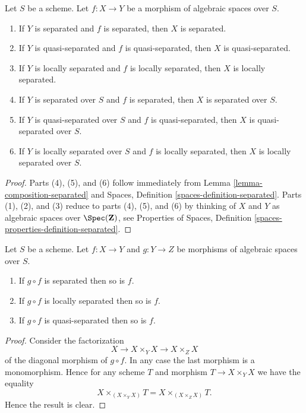 \begin{lemma}
\label{lemma-separated-over-separated}
Let $S$ be a scheme.
Let $f : X \to Y$ be a morphism of algebraic spaces over $S$.
\begin{enumerate}
\item If $Y$ is separated and $f$ is separated, then $X$ is separated.
\item If $Y$ is quasi-separated and $f$ is quasi-separated, then
$X$ is quasi-separated.
\item If $Y$ is locally separated and $f$ is locally separated, then
$X$ is locally separated.
\item If $Y$ is separated over $S$ and $f$ is separated, then
$X$ is separated over $S$.
\item If $Y$ is quasi-separated over $S$ and $f$ is quasi-separated, then
$X$ is quasi-separated over $S$.
\item If $Y$ is locally separated over $S$ and $f$ is locally separated, then
$X$ is locally separated over $S$.
\end{enumerate}
\end{lemma}

\begin{proof}
Parts (4), (5), and (6) follow immediately from
Lemma \ref{lemma-composition-separated}
and
Spaces, Definition \ref{spaces-definition-separated}.
Parts (1), (2), and (3) reduce to parts (4), (5), and (6) by thinking
of $X$ and $Y$ as algebraic spaces over $\Spec(\mathbf{Z})$, see
Properties of Spaces, Definition \ref{spaces-properties-definition-separated}.
\end{proof}

\begin{lemma}
\label{lemma-compose-after-separated}
Let $S$ be a scheme.
Let $f : X \to Y$ and $g : Y \to Z$ be morphisms of algebraic spaces over $S$.
\begin{enumerate}
\item If $g \circ f$ is separated then so is $f$.
\item If $g \circ f$ is locally separated then so is $f$.
\item If $g \circ f$ is quasi-separated then so is $f$.
\end{enumerate}
\end{lemma}

\begin{proof}
Consider the factorization
$$
X \to X \times_Y X \to X \times_Z X
$$
of the diagonal morphism of $g \circ f$. In any case the last morphism
is a monomorphism. Hence for any scheme $T$ and morphism
$T \to X \times_Y X$ we have the equality
$$
X \times_{(X \times_Y X)} T = X \times_{(X \times_Z X)} T.
$$
Hence the result is clear.
\end{proof}


